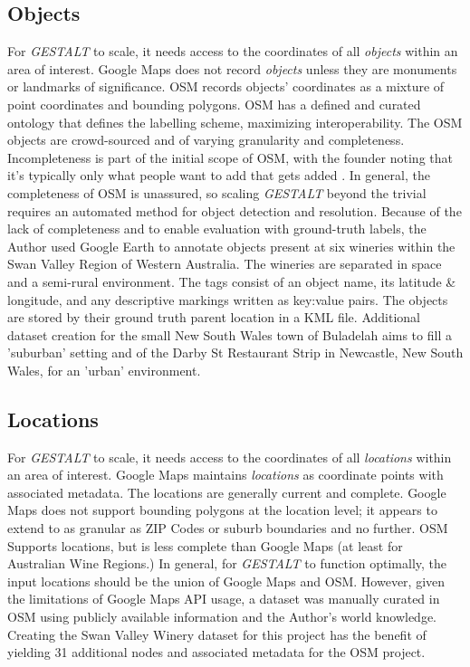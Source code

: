 \subsection{Objects}
For \textit{GESTALT} to scale, it needs access to the coordinates of all \textit{objects} within an area of interest. 
Google Maps does not record \textit{objects} unless they are monuments or landmarks of significance. 
OSM records objects' coordinates as a mixture of point coordinates and bounding polygons. 
OSM has a defined and curated ontology that defines the labelling scheme, maximizing interoperability. 
The OSM objects are crowd-sourced and of varying granularity and completeness. Incompleteness is part of the initial scope of OSM, with the founder noting that it's typically only what people want to add that gets added \cite{Haklay2008}.
In general, the completeness of OSM is unassured, so scaling \textit{GESTALT} beyond the trivial requires an automated method for object detection and resolution. 
Because of the lack of completeness and to enable evaluation with ground-truth labels, the Author used Google Earth to annotate objects present at six wineries within the Swan Valley Region of Western Australia. The wineries are separated in space and a semi-rural environment. The tags consist of an object name, its latitude \& longitude, and any descriptive markings written as key:value pairs. The objects are stored by their ground truth parent location in a KML file. Additional dataset creation for the small New South Wales town of Buladelah aims to fill a 'suburban' setting and of the Darby St Restaurant Strip in Newcastle, New South Wales, for an 'urban' environment. 


\subsection{Locations}
For \textit{GESTALT} to scale, it needs access to the coordinates of all \textit{locations} within an area of interest. 
Google Maps maintains \textit{locations} as coordinate points with associated metadata. The locations are generally current and complete. 
Google Maps does not support bounding polygons at the location level; it appears to extend to as granular as ZIP Codes or suburb boundaries and no further. 
OSM Supports locations, but is less complete than Google Maps (at least for Australian Wine Regions.)
In general, for \textit{GESTALT} to function optimally, the input locations should be the union of Google Maps and OSM. However, given the limitations of Google Maps API usage, a dataset was manually curated in OSM using publicly available information and the Author's world knowledge. 
Creating the Swan Valley Winery dataset for this project has the benefit of yielding 31 additional nodes and associated metadata for the OSM project. 

